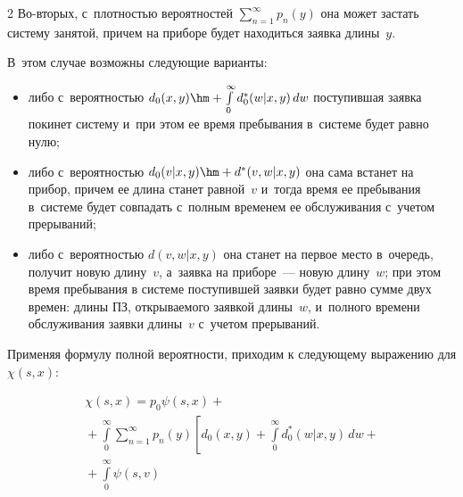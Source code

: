 \begin{multicols}{2}
Во-вторых, с~плот\-ностью вероятностей $\sum\nolimits_{n=1}^\infty p_n(y)$ она может застать систему занятой, причем на приборе будет находиться заявка длины~$y$.


В~этом случае возможны следующие вари\-анты:


\begin{itemize}


 \item либо с~вероятностью $d_0(x,y)\hm+\int\limits_0^\infty d_0^*(w|x,y)\,dw$ поступившая заявка покинет систему и~при этом ее время пребывания в~сис\-те\-ме будет равно нулю;





\item  либо с~вероятностью $d_0(v|x,y)\hm+d^*(v,w|x,y)$ она сама встанет на прибор, причем ее длина станет равной~$v$ и~тогда время ее пребывания в~сис\-те\-ме будет совпадать с~полным временем ее обслуживания с~учетом прерываний;





\item  либо с~вероятностью $d(v,w|x,y)$ она станет на первое место в~очередь, получит новую длину~$v$, а~заявка на приборе~--- новую длину~$w$; при этом время пребывания в системе поступившей заявки будет равно сумме двух времен: длины ПЗ, открываемого заявкой длины~$w$, и~полного времени обслуживания заявки длины~$v$ с~учетом прерываний.


    \end{itemize}





Применяя формулу полной вероятности, приходим к следующему выражению для $\chi(s,x)$:


\begin{multline*}




\chi(s,x)= p_0\psi(s,x)+{}\\


{}+


\int\limits_0^\infty\sum\limits_{n=1}^\infty p_n(y) \left [


d_0(x,y)+\int\limits_0^\infty d_0^*(w|x,y)\,dw


+{}\right.


\\


{}+


\int\limits_0^\infty\! \psi(s,v)



\end{multline*}
\end{multicols}
